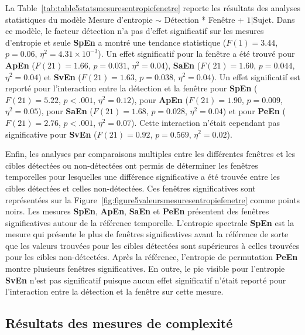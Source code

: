 La Table~\ref{tab:table5statsmesuresentropiefenetre} reporte les résultats des analyses statistiques du modèle Mesure d'entropie $\sim$ Détection * Fenêtre + $1|$Sujet. 
Dans ce modèle, le facteur détection n'a pas d'effet significatif sur les mesures d'entropie et seule \textbf{SpEn} a montré une tendance statistique ($F(1)=3.44$, $p=0.06$, $\eta^2=4.31\times10^{-3}$).
Un effet significatif pour la fenêtre a été trouvé pour \textbf{ApEn} ($F(21)=1.66$, $p=0.031$, $\eta^2=0.04$), \textbf{SaEn} ($F(21)=1.60$, $p=0.044$, $\eta^2=0.04$) et \textbf{SvEn} ($F(21)=1.63$, $p=0.038$, $\eta^2=0.04$). 
Un effet significatif est reporté pour l'interaction entre la détection et la fenêtre pour \textbf{SpEn} ($F(21)=5.22$, $p<.001$, $\eta^2=0.12$), pour \textbf{ApEn} ($F(21)=1.90$, $p=0.009$, $\eta^2=0.05$), pour \textbf{SaEn} ($F(21)=1.68$, $p=0.028$, $\eta^2=0.04$) et pour \textbf{PeEn} ($F(21)=2.76$, $p<.001$, $\eta^2=0.07$). 
Cette interaction n'était cependant pas significative pour \textbf{SvEn} ($F(21)=0.92$, $p=0.569$, $\eta^2=0.02$). 

Enfin, les analyses par comparaisons multiples entre les différentes fenêtres et les cibles détectées ou non-détectées ont permis de déterminer les fenêtres temporelles pour lesquelles une différence significative a été trouvée entre les cibles détectées et celles non-détectées.
Ces fenêtres significatives sont représentées sur la Figure~\ref{fig:figure5valeursmesuresentropiefenetre} comme points noirs. 
Les mesures \textbf{SpEn}, \textbf{ApEn}, \textbf{SaEn} et \textbf{PeEn} présentent des fenêtres significatives autour de la référence temporelle. 
L'entropie spectrale \textbf{SpEn} est la mesure qui présente le plus de fenêtres significatives avant la référence de sorte que les valeurs trouvées pour les cibles détectées sont supérieures à celles trouvées pour les cibles non-détectées. 
Après la référence, l'entropie de permutation \textbf{PeEn} montre plusieurs fenêtres significatives. 
En outre, le pic visible pour l'entropie \textbf{SvEn} n'est pas significatif puisque aucun effet significatif n'était reporté pour l'interaction entre la détection et la fenêtre sur cette mesure. 

\subsection{Résultats des mesures de complexité}
\label{resultatsmesurescomplexite}

